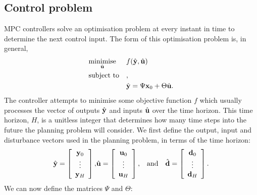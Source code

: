 \subsection{Control problem}

MPC controllers solve an optimisation problem at every instant in time to determine the next control input.
The form of this optimisation problem is, in general,
\begin{equation}
   \label{eq:mpc-opt}
   \optimise
      {minimise}{\hvec{u}}
      {f(\hvec{y}, \hvec{u})}
      {\hvec{y} = \Psi \vec{x}_0 + \Theta \hvec{u}}
\end{equation}
The controller attempts to minimise some objective function $f$ which usually processes the vector of outputs $\hat{\mathbf{y}}$ and inputs $\hat{\mathbf{u}}$ over the time horizon.
This time horizon, $H$, is a unitless integer that determines how many time steps into the future the planning problem will consider.
We first define the output, input and disturbance vectors used in the planning problem, in terms of the time horizon:
\begin{eqnarray}
   \label{eq:mpc-vectors}
   \hat{\mathbf{y}} = \left[\begin{array}{c}
      \mathbf{y}_0 \\
      \vdots \\
      \mathbf{y}_H
   \end{array}\right],
   &
   \hat{\mathbf{u}} = \left[\begin{array}{c}
      \mathbf{u}_0 \\
      \vdots \\
      \mathbf{u}_H
   \end{array}\right],
   & \text{and} \quad
   \hat{\mathbf{d}} = \left[\begin{array}{c}
      \mathbf{d}_0 \\
      \vdots \\
      \mathbf{d}_H
   \end{array}\right].
\end{eqnarray}
We can now define the matrices $\Psi$ and $\Theta$:
